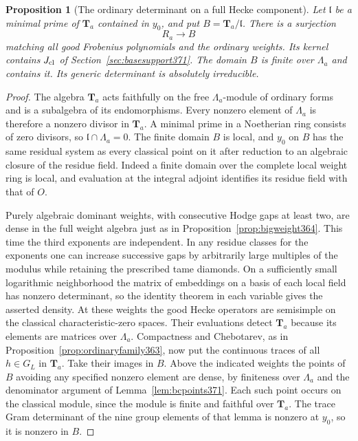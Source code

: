 \documentclass[a4paper,11pt]{article}
\newtheorem{proposition}{Proposition}[section]
\theoremstyle{definition}
\theoremstyle{remark}
\numberwithin{equation}{section}
\begin{document}
\begin{proposition}[The ordinary determinant on a full Hecke component]
\label{prop:upfamily372}
Let \(\mathfrak l\) be a minimal prime of \(\mathbf T_a\)
contained in \(y_0\), and put \(B=\mathbf T_a/\mathfrak l\).
There is a surjection
\[
                         R_a\longrightarrow B
\]
matching all good Frobenius polynomials and the ordinary
weights. Its kernel contains \(J_{\rm cl}\) of
Section~\ref{sec:basesupport371}. The domain \(B\) is finite
over \(\Lambda_a\) and contains it. Its generic determinant
is absolutely irreducible.
\end{proposition}
\begin{proof}
The algebra \(\mathbf T_a\) acts faithfully on the free
\(\Lambda_a\)-module of ordinary forms and is a subalgebra
of its endomorphisms. Every nonzero element of \(\Lambda_a\)
is therefore a nonzero divisor in \(\mathbf T_a\). A minimal
prime in a Noetherian ring consists of zero divisors, so
\(\mathfrak l\cap\Lambda_a=0\). The finite domain \(B\) is
local, and \(y_0\) on \(B\) has the same residual system as
every classical point on it after reduction to an algebraic
closure of the residue field. Indeed a finite domain over
the complete local weight ring is local, and evaluation at
the integral adjoint identifies its residue field with that
of \(O\).

Purely algebraic dominant weights, with consecutive Hodge
gaps at least two, are dense in the full weight algebra
just as in Proposition~\ref{prop:bigweight364}. This time
the third exponents are independent. In any residue classes
for the exponents one can increase successive gaps by
arbitrarily large multiples of the modulus while retaining
the prescribed tame diamonds. On a sufficiently small
logarithmic neighborhood the matrix of embeddings on a
basis of each local field has nonzero determinant, so the
identity theorem in each variable gives the asserted
density. At these weights the good Hecke operators are
semisimple on the classical characteristic-zero spaces.
Their evaluations detect \(\mathbf T_a\) because its elements
are matrices over \(\Lambda_a\). Compactness and Chebotarev,
as in Proposition~\ref{prop:ordinaryfamily363}, now put the
continuous traces of all \(h\in G_L\) in \(\mathbf T_a\).
Take their images in \(B\). Above the indicated weights the
points of \(B\) avoiding any specified nonzero element are
dense, by finiteness over \(\Lambda_a\) and the denominator
argument of Lemma~\ref{lem:bcpoints371}. Each such point
occurs on the classical module, since the module is finite
and faithful over \(\mathbf T_a\). The trace Gram determinant
of the nine group elements of that lemma is nonzero at \(y_0\),
so it is nonzero in \(B\).


\end{proof}
\end{document}

